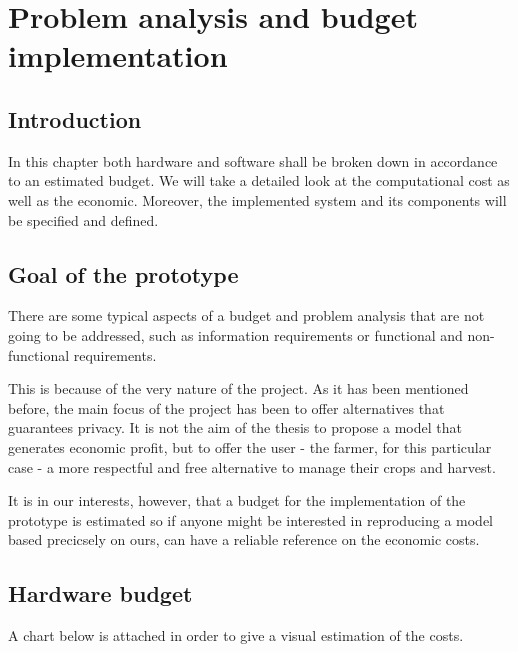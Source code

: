 \chapter{Problem analysis and budget implementation}\label{cap:analisis}

\section{Introduction}
In this chapter both hardware and software shall be broken down in accordance to an estimated budget. We will take a detailed look at the computational cost as well as the economic. Moreover, the implemented system and its components will be specified and defined.

\section{Goal of the prototype}
There are some typical aspects of a budget and problem analysis that are not going to be addressed, such as information requirements or functional and non-functional requirements.

This is because of the very nature of the project. As it has been mentioned before, the main focus of the project has been to offer alternatives that guarantees privacy. It is not the aim of the thesis to propose a model that generates economic profit, but to offer the user - the farmer, for this particular case - a more respectful and free alternative to manage their crops and harvest.

It is in our interests, however, that a budget for the implementation of the prototype is estimated so if anyone might be interested in reproducing a model based precicsely on ours, can have a reliable reference on the economic costs.

\section{Hardware budget}
A chart below is attached in order to give a visual estimation of the costs.

